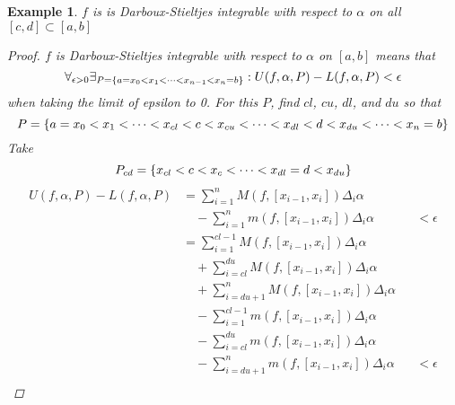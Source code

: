 \documentclass[]{article}
\newtheorem{example}{Example}
\begin{document}
\begin{example}
    $f$ is is Darboux-Stieltjes integrable with respect to $\alpha$ on all $[c,d] \subset [a,b]$
    \begin{proof}
        $f$ is Darboux-Stieltjes integrable with respect to $\alpha$ on $[a,b]$ means that \[
            \forall_{\epsilon>0} \exists_{P = \qty{a = x_0 < x_1 < \cdots < x_{n-1} < x_n = b}} : 
            U(f,\alpha,P) - L(f,\alpha,P) < \epsilon
        \] when taking the limit of epsilon to 0. 
        For this $P$, find $cl$, $cu$, $dl$, and $du$ so that\[
            P = \qty{a = x_0 < x_1 < \cdots < x_{cl} < c < x_{cu} < \cdots < x_{dl} < d < x_{du} < \cdots < x_n = b}
        \] Take \[
            P_{cd} = \qty{x_{cl} < c < x_{c} < \cdots < x_{dl} = d < x_{du}}
        \]
        \begin{align*}
            U(f,\alpha,P) - L(f,\alpha,P) 
                &= \sum_{i=1}^n M(f, [x_{i-1},x_{i}]) \Delta_i \alpha\\
                    &\quad - \sum_{i=1}^n m(f, [x_{i-1},x_{i}]) \Delta_i \alpha
                    &&< \epsilon\\
                &= \sum_{i=1}^{cl-1} M(f, [x_{i-1},x_{i}]) \Delta_i \alpha\\
                    &\quad + \sum_{i=cl}^{du} M(f, [x_{i-1},x_{i}]) \Delta_i \alpha\\
                    &\quad + \sum_{i=du+1}^n M(f, [x_{i-1},x_{i}]) \Delta_i \alpha\\
                    &\quad - \sum_{i=1}^{cl-1} m(f, [x_{i-1},x_{i}]) \Delta_i \alpha\\
                    &\quad - \sum_{i=cl}^{du} m(f, [x_{i-1},x_{i}]) \Delta_i \alpha\\
                    &\quad - \sum_{i=du+1}^{n} m(f, [x_{i-1},x_{i}]) \Delta_i \alpha
                    &&< \epsilon\\

\end{align*}
\end{proof}
\end{example}
\end{document}
